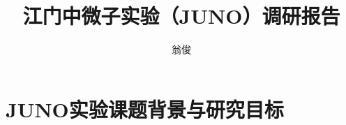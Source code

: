 \documentclass[10pt,a4paper]{article}
\author{翁俊}
\title{江门中微子实验（JUNO）调研报告}
\begin{document}
\maketitle
\newpage
\tableofcontents
\newpage

\section{JUNO实验课题背景与研究目标}


\newpage



\end{document}
